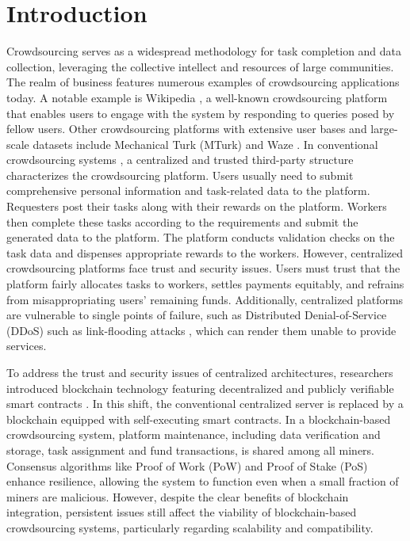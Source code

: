 \documentclass[10pt,journal]{IEEEtran}
\begin{document}
\maketitle
\IEEEdisplaynontitleabstractindextext
\IEEEpeerreviewmaketitle

\section{Introduction}
Crowdsourcing serves as a widespread methodology for task completion and data collection, leveraging the collective intellect and resources of large communities. The realm of business features numerous examples of crowdsourcing applications today. A notable example is Wikipedia \cite{wikipedia}, a well-known crowdsourcing platform that enables users to engage with the system by responding to queries posed by fellow users. Other crowdsourcing platforms with extensive user bases and large-scale datasets include Mechanical Turk (MTurk) \cite{MechanicalTurk} and Waze \cite{Waze}. In conventional crowdsourcing systems \cite{wu2014smartphones, to2016differentially, wang2019optimization, xiao2016online, miao2017lightweight}, a centralized and trusted third-party structure characterizes the crowdsourcing platform. Users usually need to submit comprehensive personal information and task-related data to the platform. Requesters post their tasks along with their rewards on the platform. Workers then complete these tasks according to the requirements and submit the generated data to the platform. The platform conducts validation checks on the task data and dispenses appropriate rewards to the workers. However, centralized crowdsourcing platforms face trust and security issues. Users must trust that the platform fairly allocates tasks to workers, settles payments equitably, and refrains from misappropriating users' remaining funds. Additionally, centralized platforms are vulnerable to single points of failure, such as Distributed Denial-of-Service (DDoS) such as link-flooding attacks \cite{huang2024you}, which can render them unable to provide services.

To address the trust and security issues of centralized architectures, researchers introduced blockchain technology featuring decentralized and publicly verifiable smart contracts \cite{an2022ppqc, li2018crowdbc, lu2018zebralancer}. In this shift, the conventional centralized server is replaced by a blockchain equipped with self-executing smart contracts. In a blockchain-based crowdsourcing system, platform maintenance, including data verification and storage, task assignment and fund transactions, is shared among all miners. Consensus algorithms like Proof of Work (PoW) \cite{nakamoto2008bitcoin} and Proof of Stake (PoS) \cite{king2012ppcoin} enhance resilience, allowing the system to function even when a small fraction of miners are malicious. However, despite the clear benefits of blockchain integration, persistent issues still affect the viability of blockchain-based crowdsourcing systems, particularly regarding scalability and compatibility.
\end{document}
